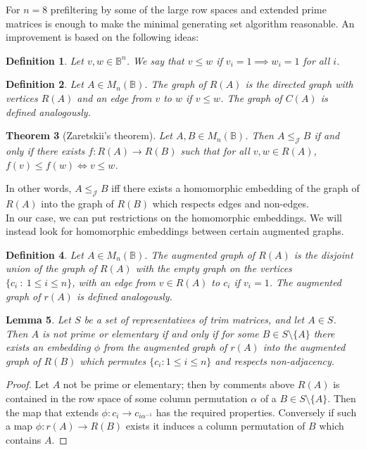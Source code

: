 \documentclass[11pt]{article}
\newtheorem{thm}{Theorem}[section]
\newtheorem{lemma}[thm]{Lemma}
\newtheorem{defi}[thm]{Definition}
\numberwithin{equation}{section}
\renewcommand{\to}{\longrightarrow}
\newcommand{\B}{\mathbb{B}}
\newcommand{\Bn}{M_n(\B)}
\newcommand{\J}{\mathscr{J}}
\begin{document}
For $n=8$ prefiltering by some of the large row spaces and extended prime
matrices is enough to make the minimal generating set algorithm reasonable.
An improvement is based on the following ideas:

\begin{defi}
  Let $v, w \in \B^n$. We say that $v \leq w$ if $v_i = 1 \implies w_i = 1$ for all $i$.
\end{defi}

\begin{defi}
  Let $A \in \Bn$. The \emph{graph} of $R(A)$ is the directed graph with vertices $R(A)$ and an edge from $v$ to $w$ if $v \leq w$. The graph of $C(A)$ is defined analogously. 
\end{defi}

\begin{thm}[Zaretskii's theorem]
  Let $A, B \in \Bn$. Then $A \leq_{\J} B$ if and only if there exists 
  $f: R(A) \to R(B)$ such that for all $v, w \in R(A)$, $f(v) \leq f(w) \iff
  v \leq w$.
\end{thm}

In other words, $A \leq_{\J} B$ iff there exists a homomorphic embedding of the 
graph of $R(A)$ into the graph of $R(B)$ which respects edges and non-edges. \\

In our case, we can put restrictions on the homomorphic embeddings. We will instead
look for homomorphic embeddings between certain augmented graphs.

\begin{defi}
  Let $A \in \Bn$. The \emph{augmented graph of $R(A)$} is the disjoint union of the graph of $R(A)$ with the empty graph on the vertices $\{c_i \: : \: 1 \leq i \leq n\}$, with an edge from $v \in R(A)$ to $c_i$ if $v_i = 1$. The \emph{augmented graph of $r(A)$} is defined analogously.
\end{defi}

\begin{lemma}
  Let $S$ be a set of representatives of trim matrices, and let $A \in S$. Then $A$ is not prime or elementary if and only if for some $B \in S\setminus \{A\}$ there exists an embedding $\phi$ from the augmented graph of $r(A)$ into the augmented graph of $R(B)$ which permutes $\{ c_i : 1 \leq i \leq n \}$ and respects non-adjacency.
\end{lemma}
\begin{proof}
  Let $A$ not be prime or elementary; then by comments above $R(A)$ is contained in the row space of some column permutation $\alpha$ of a $B \in S \setminus \{A\}$. Then the map that extends $\phi : c_i \to c_{i\alpha^{-1}}$ has the required properties. Conversely if such a map $\phi : r(A) \to R(B)$ exists it induces a column permutation of $B$ which contains $A$. 
\end{proof}
\end{document}
